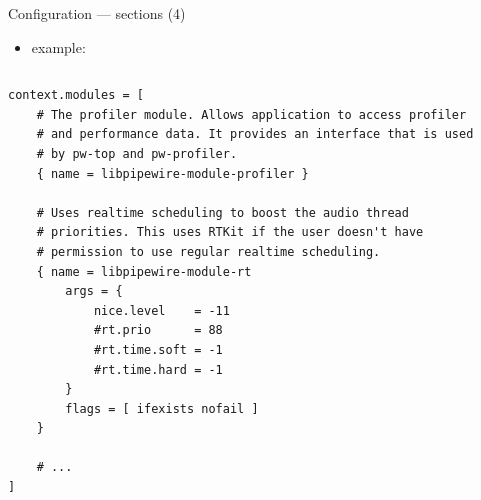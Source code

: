 \begin{frame}[fragile]{Configuration — sections (4)}

  \begin{itemize}
  \item {} example:
  \end{itemize}

  \begin{columns}
    \begin{block}{}
      \fontsize{8}{8}\selectfont
        \begin{verbatim}
context.modules = [
    # The profiler module. Allows application to access profiler
    # and performance data. It provides an interface that is used
    # by pw-top and pw-profiler.
    { name = libpipewire-module-profiler }

    # Uses realtime scheduling to boost the audio thread
    # priorities. This uses RTKit if the user doesn't have
    # permission to use regular realtime scheduling.
    { name = libpipewire-module-rt
        args = {
            nice.level    = -11
            #rt.prio      = 88
            #rt.time.soft = -1
            #rt.time.hard = -1
        }
        flags = [ ifexists nofail ]
    }

    # ...
]
        \end{verbatim}
      \end{block}
  \end{columns}

\end{frame}



